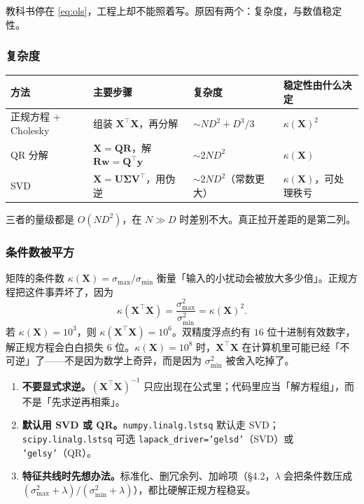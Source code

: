 \documentclass[11pt,a4paper,fontset=windows,zihao=-4]{ctexart}
\newcommand{\bX}{\mathbf{X}}
\newcommand{\by}{\mathbf{y}}
\newcommand{\bw}{\mathbf{w}}
\newcommand{\bQ}{\mathbf{Q}}
\newcommand{\bR}{\mathbf{R}}
\newcommand{\bV}{\mathbf{V}}
\newcommand{\bU}{\mathbf{U}}
\newcommand{\bSigma}{\boldsymbol{\Sigma}}
\newcommand{\tp}{^{\top}}
\newcommand{\tabhead}{\sffamily\bfseries\color{navy}}
\begin{document}
教科书停在 \eqref{eq:ols}，工程上却不能照着写。原因有两个：复杂度，与数值稳定性。

\subsubsection{复杂度}

\begin{center}
\small
\begin{tabular}{@{}llll@{}}
\toprule
\rowcolor{navy!7}
\tabhead 方法 & \tabhead 主要步骤 & \tabhead 复杂度 & \tabhead 稳定性由什么决定\\
\midrule
正规方程 + Cholesky & 组装 $\bX\tp\bX$，再分解 & $\sim ND^2+D^3/3$ & $\kappa(\bX)^2$\\
QR 分解 & $\bX=\bQ\bR$，解 $\bR\bw=\bQ\tp\by$ & $\sim 2ND^2$ & $\kappa(\bX)$\\
SVD & $\bX=\bU\bSigma\bV\tp$，用伪逆 & $\sim 2ND^2$（常数更大） & $\kappa(\bX)$，可处理秩亏\\
\bottomrule
\end{tabular}
\end{center}

三者的量级都是 $O(ND^2)$，在 $N\gg D$ 时差别不大。真正拉开差距的是第二列。

\subsubsection{条件数被平方}

矩阵的条件数 $\kappa(\bX)=\sigma_{\max}/\sigma_{\min}$ 衡量「输入的小扰动会被放大多少倍」。正规方程把这件事弄坏了，因为
\begin{equation}
  \kappa(\bX\tp\bX)=\frac{\sigma_{\max}^2}{\sigma_{\min}^2}=\kappa(\bX)^2 .
\end{equation}
若 $\kappa(\bX)=10^{3}$，则 $\kappa(\bX\tp\bX)=10^{6}$。双精度浮点约有 $16$ 位十进制有效数字，解正规方程会白白损失 $6$ 位。$\kappa(\bX)=10^{8}$ 时，$\bX\tp\bX$ 在计算机里可能已经「不可逆」了——不是因为数学上奇异，而是因为 $\sigma_{\min}^2$ 被舍入吃掉了。

\begin{keybox}[实践建议]
\begin{enumerate}[label=(\arabic*),leftmargin=1.9em]
  \item \textbf{不要显式求逆。}$(\bX\tp\bX)^{-1}$ 只应出现在公式里；代码里应当「解方程组」，而不是「先求逆再相乘」。
  \item \textbf{默认用 SVD 或 QR。}\texttt{numpy.linalg.lstsq} 默认走 SVD；\texttt{scipy.linalg.lstsq} 可选 \texttt{lapack\_driver='gelsd'}（SVD）或 \texttt{'gelsy'}（QR）。
  \item \textbf{特征共线时先想办法。}标准化、删冗余列、加岭项（\S4.2，$\lambda$ 会把条件数压成 $(\sigma_{\max}^2+\lambda)/(\sigma_{\min}^2+\lambda)$），都比硬解正规方程稳妥。
\end{enumerate}
\end{keybox}
\end{document}

